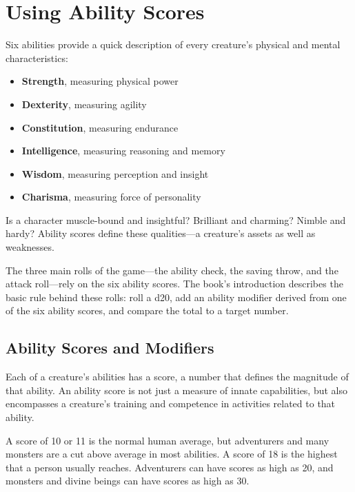\documentclass[
]{article}
\date{}
\begin{document}
\hypertarget{using-ability-scores}{%
\section{Using Ability Scores}\label{using-ability-scores}}

Six abilities provide a quick description of every creature's physical
and mental characteristics:

\begin{itemize}
\item
  \textbf{Strength}, measuring physical power
\item
  \textbf{Dexterity}, measuring agility
\item
  \textbf{Constitution}, measuring endurance
\item
  \textbf{Intelligence}, measuring reasoning and memory
\item
  \textbf{Wisdom}, measuring perception and insight
\item
  \textbf{Charisma}, measuring force of personality
\end{itemize}

Is a character muscle-bound and insightful? Brilliant and charming?
Nimble and hardy? Ability scores define these qualities---a creature's
assets as well as weaknesses.

The three main rolls of the game---the ability check, the saving throw,
and the attack roll---rely on the six ability scores. The book's
introduction describes the basic rule behind these rolls: roll a d20,
add an ability modifier derived from one of the six ability scores, and
compare the total to a target number.

\hypertarget{ability-scores-and-modifiers}{%
\subsection{Ability Scores and
Modifiers}\label{ability-scores-and-modifiers}}

Each of a creature's abilities has a score, a number that defines the
magnitude of that ability. An ability score is not just a measure of
innate capabilities, but also encompasses a creature's training and
competence in activities related to that ability.

A score of 10 or 11 is the normal human average, but adventurers and
many monsters are a cut above average in most abilities. A score of 18
is the highest that a person usually reaches. Adventurers can have
scores as high as 20, and monsters and divine beings can have scores as
high as 30.
\end{document}
